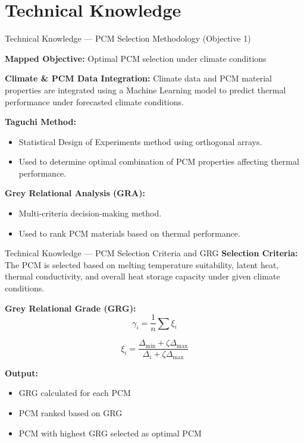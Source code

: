 \documentclass[aspectratio=169, 11pt]{beamer}
\begin{document}
\section{Technical Knowledge}
\begin{frame}{Technical Knowledge --- PCM Selection Methodology (Objective 1)}
\small

\textbf{Mapped Objective:} Optimal PCM selection under climate conditions

\vspace{0.2cm}
\textbf{Climate \& PCM Data Integration:}
Climate data and PCM material properties are integrated using a Machine Learning model to predict thermal performance under forecasted climate conditions.

\vspace{0.3cm}
\textbf{Taguchi Method:}\cite{Chen2025TaguchiPCM}
\begin{itemize}
    \item Statistical Design of Experiments method using orthogonal arrays.
    \item Used to determine optimal combination of PCM properties affecting thermal performance.
\end{itemize}

\vspace{0.3cm}
\textbf{Grey Relational Analysis (GRA):}
\begin{itemize}
    \item Multi-criteria decision-making method.
    \item Used to rank PCM materials based on thermal performance.
\end{itemize}

\end{frame}

\begin{frame}{Technical Knowledge --- PCM Selection Criteria and GRG}
\small
\textbf{Selection Criteria:} The PCM is selected based on melting temperature suitability, latent heat, thermal conductivity, and overall heat storage capacity under given climate conditions.

\vspace{0.2cm}
\textbf{Grey Relational Grade (GRG):}
\[
\gamma_i = \frac{1}{n} \sum \xi_i
\]

\[
\xi_i = \frac{\Delta_{\min} + \zeta \Delta_{\max}}{\Delta_i + \zeta \Delta_{\max}}
\]

\vspace{0.2cm}
\textbf{Output:}
\begin{itemize}
    \item GRG calculated for each PCM
    \item PCM ranked based on GRG
    \item PCM with highest GRG selected as optimal PCM
\end{itemize}

\end{frame}
\end{document}

